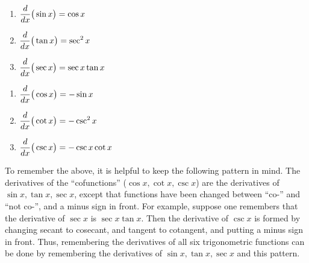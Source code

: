 {		\noindent\begin{minipage}[t]{.5\specialboxlength}
		\begin{enumerate}
		\item		$\displaystyle \frac{d}{dx}\big(\sin x\big) = \cos x$\addtocounter{enumi}{1}
		\item		$\displaystyle \frac{d}{dx}\big(\tan x\big) = \sec^2 x$\addtocounter{enumi}{1}
		\item		$\displaystyle \frac{d}{dx}\big(\sec x\big) = \sec x\tan x$\addtocounter{enumi}{1}
		\end{enumerate}
		\end{minipage}
		\noindent\begin{minipage}[t]{.5\specialboxlength}
		\begin{enumerate}\addtocounter{enumi}{1}
		\item		$\displaystyle \frac{d}{dx}\big(\cos x\big) = -\sin x$\addtocounter{enumi}{1}
		\item		$\displaystyle \frac{d}{dx}\big(\cot x\big) = -\csc^2 x$\addtocounter{enumi}{1}
		\item		$\displaystyle \frac{d}{dx}\big(\csc x\big) = -\csc x\cot x$
		\end{enumerate}
		\end{minipage}
}

To remember the above, it is helpful to keep the following pattern in mind.  The derivatives of the ``cofunctions'' ($\cos x, \cot x, \csc x$) are the derivatives of $\sin x, \tan x, \sec x$, except that functions have been changed between ``co-'' and ``not co-'', and a minus sign in front.  For example, suppose one remembers that the derivative of $\sec x$ is $\sec x \tan x$.  Then the derivative of $\csc x$ is formed by changing secant to cosecant, and tangent to cotangent, and putting a minus sign in front.  Thus, remembering the derivatives of all six trigonometric functions can be done by remembering the derivatives of $\sin x, \tan x, \sec x$ and this pattern.\\

